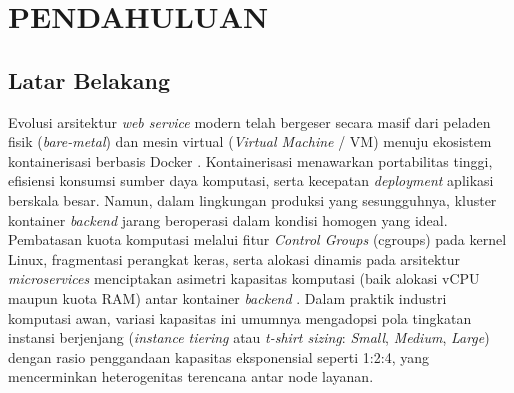 
\chapter{PENDAHULUAN}

\section{Latar Belakang}
Evolusi arsitektur \textit{web service} modern telah bergeser secara masif dari peladen fisik (\textit{bare-metal}) dan mesin virtual (\textit{Virtual Machine} / VM) menuju ekosistem kontainerisasi berbasis Docker \citep{khan2026decomposing, gurramkonda2026docker, nurzaman2022analisis}. Kontainerisasi menawarkan portabilitas tinggi, efisiensi konsumsi sumber daya komputasi, serta kecepatan \textit{deployment} aplikasi berskala besar. Namun, dalam lingkungan produksi yang sesungguhnya, kluster kontainer \textit{backend} jarang beroperasi dalam kondisi homogen yang ideal. Pembatasan kuota komputasi melalui fitur \textit{Control Groups} (cgroups) pada kernel Linux, fragmentasi perangkat keras, serta alokasi dinamis pada arsitektur \textit{microservices} menciptakan asimetri kapasitas komputasi (baik alokasi vCPU maupun kuota RAM) antar kontainer \textit{backend} \citep{shetty2025cpu, faridah2026performance}. Dalam praktik industri komputasi awan, variasi kapasitas ini umumnya mengadopsi pola tingkatan instansi berjenjang (\textit{instance tiering} atau \textit{t-shirt sizing}: \textit{Small}, \textit{Medium}, \textit{Large}) dengan rasio penggandaan kapasitas eksponensial seperti 1:2:4, yang mencerminkan heterogenitas terencana antar node layanan.

